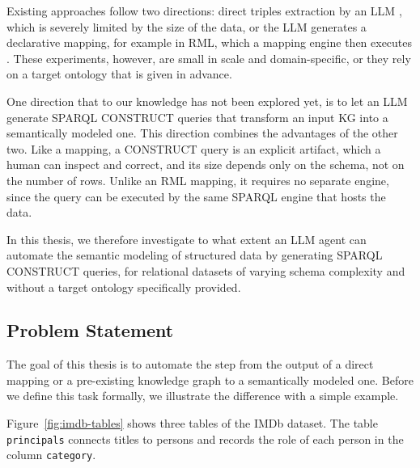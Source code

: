 Existing approaches follow two directions: direct triples extraction by an LLM \citep{hariri2025towards, pellegrino2025quality}, which is severely limited by the size of the data, or the LLM generates a declarative mapping, for example in RML, which a mapping engine then executes \citep{hofer2024towards, randles2024r2}. These experiments, however, are small in scale and domain-specific, or they rely on a target ontology that is given in advance.

One direction that to our knowledge has not been explored yet, is to let an LLM generate SPARQL CONSTRUCT queries that transform an input KG into a semantically modeled one. This direction combines the advantages of the other two. Like a mapping, a CONSTRUCT query is an explicit artifact, which a human can inspect and correct, and its size depends only on the schema, not on the number of rows. Unlike an RML mapping, it requires no separate engine, since the query can be executed by the same SPARQL engine that hosts the data. 

In this thesis, we therefore investigate to what extent an LLM agent can automate the semantic modeling of structured data by generating SPARQL CONSTRUCT queries, for relational datasets of varying schema complexity and without a target ontology specifically provided.

\subsection{Problem Statement}\label{sec:problem-statement}
The goal of this thesis is to automate the step from the output of a direct mapping or a pre-existing knowledge graph to a semantically modeled one. Before we define this task formally, we illustrate the difference with a simple example.

Figure~\ref{fig:imdb-tables} shows three tables of the IMDb dataset. The table \texttt{principals} connects titles to persons and records the role of each person in the column \texttt{category}. 

